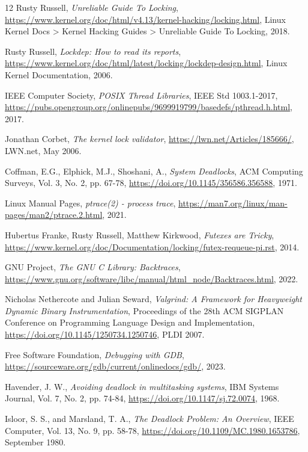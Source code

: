
\begin{thebibliography}{12}
    Rusty Russell,
    \emph{Unreliable Guide To Locking},
    \url{https://www.kernel.org/doc/html/v4.13/kernel-hacking/locking.html},
    Linux Kernel Docs > Kernel Hacking Guides > Unreliable Guide To Locking, 2018.

  Rusty Russell,
  \emph{Lockdep: How to read its reports},
  \url{https://www.kernel.org/doc/html/latest/locking/lockdep-design.html},
  Linux Kernel Documentation, 2006.

  IEEE Computer Society,
  \emph{POSIX Thread Libraries},
  IEEE Std 1003.1-2017,
  \url{https://pubs.opengroup.org/onlinepubs/9699919799/basedefs/pthread.h.html}, 2017.

  Jonathan Corbet,
  \emph{The kernel lock validator},
  \url{https://lwn.net/Articles/185666/},
  LWN.net, May 2006.

  Coffman, E.G., Elphick, M.J., Shoshani, A.,
  \emph{System Deadlocks},
  ACM Computing Surveys, Vol. 3, No. 2, pp. 67-78,
  \url{https://doi.org/10.1145/356586.356588}, 1971.

  Linux Manual Pages,
  \emph{ptrace(2) - process trace},
  \url{https://man7.org/linux/man-pages/man2/ptrace.2.html}, 2021.

  Hubertus Franke, Rusty Russell, Matthew Kirkwood,
  \emph{Futexes are Tricky},
  \url{https://www.kernel.org/doc/Documentation/locking/futex-requeue-pi.rst}, 2014.

  GNU Project,
  \emph{The GNU C Library: Backtraces},
  \url{https://www.gnu.org/software/libc/manual/html_node/Backtraces.html}, 2022.

  Nicholas Nethercote and Julian Seward,
  \emph{Valgrind: A Framework for Heavyweight Dynamic Binary Instrumentation},
  Proceedings of the 28th ACM SIGPLAN Conference on Programming Language Design and Implementation,
  \url{https://doi.org/10.1145/1250734.1250746}, PLDI 2007.

  Free Software Foundation,
  \emph{Debugging with GDB},
  \url{https://sourceware.org/gdb/current/onlinedocs/gdb/}, 2023.

  Havender, J. W.,
  \emph{Avoiding deadlock in multitasking systems},
  IBM Systems Journal, Vol. 7, No. 2, pp. 74-84,
  \url{https://doi.org/10.1147/sj.72.0074}, 1968.

  Isloor, S. S., and Marsland, T. A.,
  \emph{The Deadlock Problem: An Overview},
  IEEE Computer, Vol. 13, No. 9, pp. 58-78,
  \url{https://doi.org/10.1109/MC.1980.1653786}, September 1980.


\end{thebibliography}

